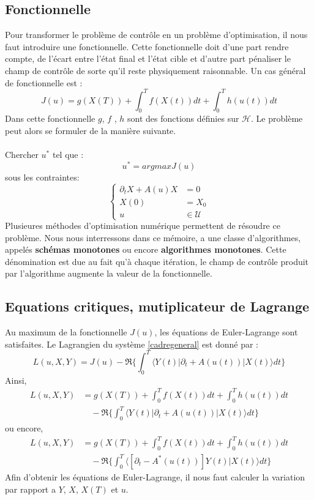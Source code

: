 \subsection{Fonctionnelle}
Pour transformer le problème de contrôle en un problème d’optimisation, il nous faut introduire une fonctionnelle. Cette fonctionnelle doit d’une part rendre compte, de l’écart entre l'état final et l'état cible et d’autre part pénaliser le champ de contrôle de sorte qu’il reste physiquement raisonnable. Un cas général de fonctionnelle est :
\begin{equation}
J(u)=g(X(T))+\int_{0}^{T} f(X(t))dt+\int_{0}^{T} h(u(t))dt
\end{equation}
Dans cette fonctionnelle $g$, $f$ , $h$ sont des fonctions définies sur $\mathcal{H}$. Le problème peut alors se formuler de la manière suivante.\\\\
Chercher $u^*$ tel que :
\begin{equation*}
u^*=argmaxJ(u)
\end{equation*}
sous les contraintes:
\begin{equation*}
\begin{cases}
\partial_{t}X +A(u)X &= 0\\
X(0) &=X_0\\
u &\in \mathcal{U}
\end{cases}
\end{equation*}
Plusieures méthodes d'optimisation numérique permettent de résoudre ce problème. Nous nous interressons dans ce mémoire, a une classe d’algorithmes, appelés \textbf{schémas monotones} ou encore \textbf{algorithmes monotones}. Cette dénomination est due au fait qu’à chaque itération, le champ de contrôle produit par l’algorithme augmente la valeur de la fonctionnelle.
\subsection{Equations critiques, mutiplicateur de Lagrange}
Au maximum de la fonctionnelle $J(u)$, les équations de Euler-Lagrange sont satisfaites. Le Lagrangien du système \eqref{cadregeneral} est donné par :
\begin{equation}
L(u,X,Y)= J(u) -\Re \bigg\{ \int_{0}^{T}\langle Y (t)|\partial_{t}+A(u(t))|X(t) \rangle dt \bigg\}
\end{equation}
Ainsi,
\begin{align*}
L(u,X,Y)&= g(X(T))+\int_{0}^{T} f(X(t))dt+\int_{0}^{T} h(u(t))dt\\
&\quad -\Re \bigg\{ \int_{0}^{T}\langle Y (t)|\partial_{t}+A(u(t))|X(t) \rangle dt \bigg\}
\end{align*}
ou encore,
\begin{align*}
L(u,X,Y)&= g(X(T))+\int_{0}^{T} f(X(t))dt+\int_{0}^{T} h(u(t))dt\\
&\quad -\Re \bigg\{ \int_{0}^{T}\langle [\partial_{t}-A^*(u(t))]Y (t)|X(t) \rangle dt \bigg\}
\end{align*}
Afin d'obtenir les équations de Euler-Lagrange, il nous faut calculer la variation par rapport a $Y$, $X$, $X(T)$ et $u$.
